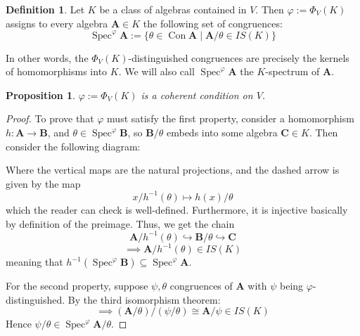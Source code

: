 \documentclass{article}
\theoremstyle{plain}
\newtheorem{proposition}[theorem]{Proposition}
\theoremstyle{definition}
\newtheorem{definition}{Definition}[section]
\newcommand{\Spec}{\operatorname{Spec}}
\begin{document}
\begin{definition}
    Let $K$ be a class of algebras contained in $V$.
    Then $\varphi := \Phi_V(K)$ assigns to every algebra $\mathbf{A} \in K$ the following set of congruences:
    $$\Spec^\varphi\mathbf{A} := \{ \theta \in \operatorname{Con}\mathbf{A} \mid \mathbf{A}/\theta \in IS(K) \}$$
\end{definition}

In other words, the $\Phi_V(K)$-distinguished congruences are precisely the kernels of homomorphisms into $K$.
We will also call $\Spec^\varphi\mathbf{A}$ the $K$-spectrum of $\mathbf{A}$.

\begin{proposition}
    $\varphi := \Phi_V(K)$ is a coherent condition on $V$.
\end{proposition}
\begin{proof}
    To prove that $\varphi$ must satisfy the first property, consider a homomorphism $h \colon \mathbf{A} \rightarrow \mathbf{B}$, and $\theta \in \Spec^\varphi\mathbf{B}$, so $\mathbf{B}/\theta$ embeds into some algebra $\mathbf{C} \in K$.
    Then consider the following diagram:
    \begin{center}
    \end{center}
    Where the vertical maps are the natural projections, and the dashed arrow is given by the map
    $$x/h^{-1}(\theta) \mapsto h(x)/\theta$$
    which the reader can check is well-defined.
    Furthermore, it is injective basically by definition of the preimage.
    Thus, we get the chain
    $$\mathbf{A}/h^{-1}(\theta) \hookrightarrow \mathbf{B}/\theta \hookrightarrow \mathbf{C}$$
    $$\implies \mathbf{A}/h^{-1}(\theta) \in IS(K)$$
    meaning that $h^{-1}(\Spec^\varphi\mathbf{B}) \subseteq\Spec^\varphi\mathbf{A}$.\par
    For the second property, suppose $\psi, \theta$ congruences of $\mathbf{A}$ with $\psi$ being $\varphi$-distinguished.
    By the third isomorphism theorem:
    $$\implies (\mathbf{A}/\theta)/(\psi/\theta) \cong\mathbf{A}/\psi \in IS(K)$$
    Hence $\psi/\theta \in \Spec^\varphi\mathbf{A}/\theta$.
\end{proof}
\end{document}
